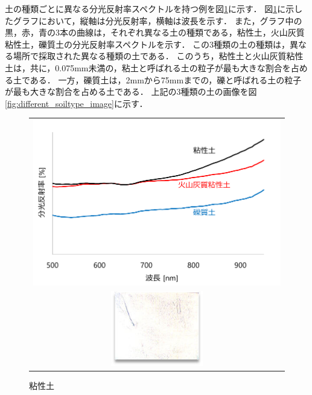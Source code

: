 土の種類ごとに異なる分光反射率スペクトルを持つ例を図\ref{fig:spectrum_for_different_soiltype}に示す．
図\ref{fig:spectrum_for_different_soiltype}に示したグラフにおいて，縦軸は分光反射率，横軸は波長を示す．
また，グラフ中の黒，赤，青の3本の曲線は，それぞれ異なる土の種類である，粘性土，火山灰質粘性土，礫質土の分光反射率スペクトルを示す．
この3種類の土の種類は，異なる場所で採取された異なる種類の土である．
このうち，粘性土と火山灰質粘性土は，共に，0.075mm未満の，粘土と呼ばれる土の粒子が最も大きな割合を占める土である．
一方，礫質土は，2mmから75mmまでの，礫と呼ばれる土の粒子が最も大きな割合を占める土である．%
上記の3種類の土の画像を図\ref{fig:different_soiltype_image}に示す．

\begin{figure}[p]
	\begin{center}
		\begin{tabular}{c}

			\begin{minipage}[t]{\linewidth}
			\includegraphics[width=13cm]{./Ch3_SoilTypeDiscrimination/Fig/spectrum_for_different_soiltype_compressed.pdf}
			\caption{土の種類ごとに異なる分光反射率スペクトル}\label{fig:spectrum_for_different_soiltype}
			\vspace{2cm}
			\end{minipage}

			\\

			\begin{minipage}[t]{0.33\linewidth}
			\includegraphics[width=4cm]{./Ch3_SoilTypeDiscrimination/Fig/A_Fu_image_compressed.pdf}
			\caption*{粘性土}
			\end{minipage}


\end{tabular}
\end{center}
\end{figure}
